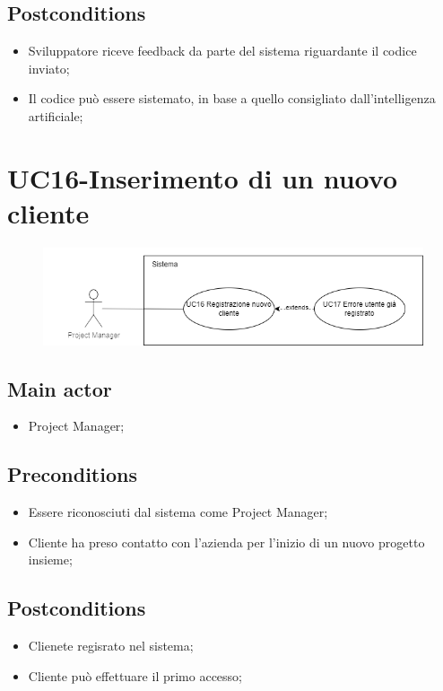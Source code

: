 \documentclass{article}
\begin{document}
    \subsection*{Postconditions}
        \begin{itemize}
            \item Sviluppatore riceve feedback da parte del sistema riguardante il codice inviato;
            \item Il codice può essere sistemato, in base a quello consigliato dall'intelligenza artificiale;
        \end{itemize}
    

        
\section{UC16-Inserimento di un nuovo cliente}
    \begin{figure}[h]
      \centering
      \includegraphics{documenti/imgUML/UC16.png}
      \label{fig:immagine}
    \end{figure}
    
    \subsection*{Main actor}
        \begin{itemize}
            \item Project Manager;
        \end{itemize}
        
    \subsection*{Preconditions}
        \begin{itemize}
            \item Essere riconosciuti dal sistema come Project Manager;
            \item Cliente ha preso contatto con l'azienda per l'inizio di un nuovo progetto insieme;
        \end{itemize}
        
    \subsection*{Postconditions}
        \begin{itemize}
            \item Clienete regisrato nel sistema;
            \item Cliente può effettuare il primo accesso;
        \end{itemize}
    
\end{document}
